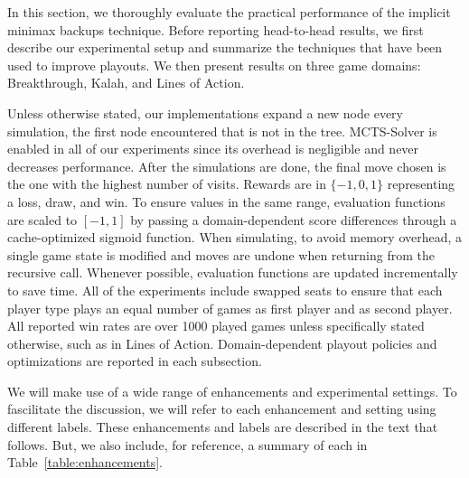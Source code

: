 \documentclass[conference]{IEEEtran}
\begin{document}
\newcommand{\UCTMAXH}{$\mbox{UCTMAX}_H$\xspace}
\newcommand{\UCTH}{$\mbox{UCT}_H$\xspace}

In this section, we thoroughly evaluate the practical performance of the implicit minimax backups technique. 
Before reporting head-to-head results, we first describe our experimental setup and 
summarize the techniques that have been used to improve playouts. We then present results on three game
domains: Breakthrough, Kalah, and Lines of Action. 

Unless otherwise stated, our implementations expand a new node every simulation, the first node encountered
that is not in the tree. MCTS-Solver is enabled in all of our experiments since its overhead is negligible and
never decreases performance. After the simulations are done, the final move chosen is the one with the highest
number of visits. 
Rewards are in $\{-1, 0, 1\}$ representing a loss, draw, and win.
To ensure values in the same range, evaluation functions are scaled to $[-1,1]$ by passing a domain-dependent 
score differences through a cache-optimized sigmoid function. 
When simulating, to avoid memory overhead, a single game state is modified and 
moves are undone when returning from the recursive call.
Whenever possible, evaluation functions are updated incrementally to save time. 
All of the experiments include swapped seats to ensure that each player type plays 
an equal number of games as first player and as second player.
All reported win rates are over 1000 played games unless specifically stated otherwise, such as in Lines of Action.
Domain-dependent playout policies and optimizations are reported in each subsection.

We will make use of a wide range of enhancements and experimental settings. To fascilitate the discussion, 
we will refer to each enhancement and setting using different labels. These enhancements and labels are described in 
the text that follows. But, we also include, for reference, a summary of each in Table~\ref{table:enhancements}.
\end{document}
